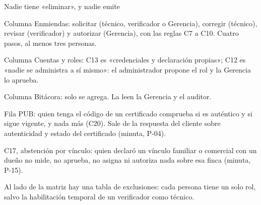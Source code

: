 \documentclass[aspectratio=169,t]{beamer}
\begin{document}
\begin{frame}{Nadie tiene «eliminar», y nadie emite}
{Columna Enmiendas: solicitar (técnico, verificador o Gerencia), corregir (técnico), revisar
(verificador) y autorizar (Gerencia), con las reglas C7 a C10. Cuatro pasos, al menos tres personas.

Columna Cuentas y roles: C13 es «credenciales y declaración propias»; C12 es «nadie se administra a sí
mismo»: el administrador propone el rol y la Gerencia lo aprueba.

Columna Bitácora: solo se agrega. La leen la Gerencia y el auditor.

Fila PUB: quien tenga el código de un certificado comprueba si es auténtico y si sigue vigente, y nada
más (C20). Sale de la respuesta del cliente sobre autenticidad y estado del certificado (minuta, P-04).

C17, abstención por vínculo: quien declaró un vínculo familiar o comercial con un dueño no mide, no
aprueba, no asigna ni autoriza nada sobre esa finca (minuta, P-15).

Al lado de la matriz hay una tabla de exclusiones: cada persona tiene un solo rol, salvo la habilitación
temporal de un verificador como técnico.}
\end{frame}
\end{document}

